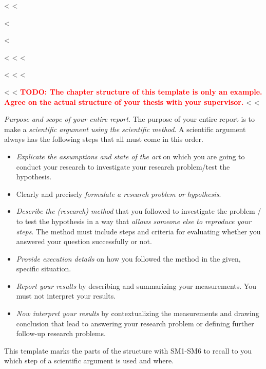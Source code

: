 {{<%
<%

<%

\renewcommand*{\chapterpagestyle}{scrplain}
\pagestyle{scrheadings}
<%

\tableofcontents
<%
<%
\mainmatter
<%

<%
<%
<%

<%
<%
\textbf{\textcolor{red}{TODO: The chapter structure of this template is only an example. Agree on the actual structure of your thesis with your supervisor.}}
<%
<%

\emph{Purpose and scope of your entire report}.
The purpose of your entire report is to make a \emph{scientific argument using the scientific method}.
A scientific argument always has the following steps that all must come in this order.
%
\begin{itemize}
  \item[SM1] \emph{Explicate the assumptions and state of the art} on which you are going to conduct your research to investigate your research problem/test the hypothesis.
  \item[SM2] Clearly and precisely \emph{formulate a research problem or hypothesis}.
  \item[SM3] \emph{Describe the (research) method} that you followed to investigate the problem / to test the hypothesis in a way that \emph{allows someone else to reproduce your steps}.
        The method must include steps and criteria for evaluating whether you answered your question successfully or not.
  \item[SM4] \emph{Provide execution details} on how you followed the method in the given, specific situation.
  \item[SM5] \emph{Report your results} by describing and summarizing your measurements.
        You must not interpret your results.
  \item[SM6] \emph{Now interpret your results} by contextualizing the measurements and drawing conclusion that lead to answering your research problem or defining further follow-up research problems.
\end{itemize}
%
This template marks the parts of the structure with SM1-SM6 to recall to you which step of a scientific argument is used and where.

}}
